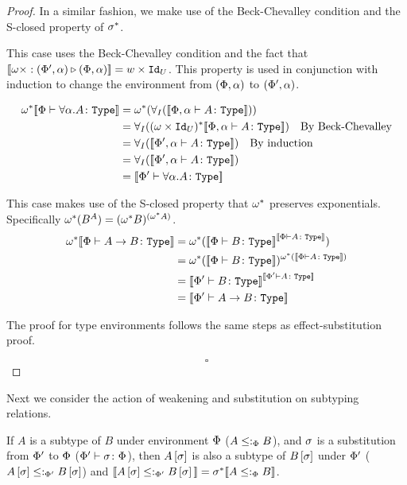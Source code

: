 \documentclass{Report}
\begin{document}
\begin{proof}
   In a similar fashion, we make use of the Beck-Chevalley condition and the S-closed property of $\si\star$.

        This case uses the Beck-Chevalley condition and the fact that $\deno{\wrel{\w\x}{(\P', \a)}{(\P,\a)}} = w\times \Id{U}$. This property is used in conjunction with induction to change the environment from $(\P, \a)$ to $(\P', \a)$.

        \begin{align}
            \w\star\deno{\typerelation{\P}{\all{\a}A}{\type}} & = \w\star(\allI(\deno{\typerelation{\P,\a}{A}{\type}}))\\
            & = \allI((\w\times\Id{U})\star\deno{\typerelation{\P,\a}{A}{\type}})\qt{By Beck-Chevalley}\\
            & = \allI(\deno{\typerelation{\P',\a}{A}{\type}})\qt{By induction}\\
            & = \allI(\deno{\typerelation{\P',\a}{A}{\type}})\\
            & = \deno{\typerelation{\P'}{\all{\a}{A}}{\type}}\\
        \end{align}
    
    This case makes use of the S-closed property that $\w\star$ preserves exponentials. Specifically $\w\star(B^A) = (\w\star B)^{(\w\star A)}$.
    \begin{align}
        \w\star\deno{\typerelation{\P}{\ab}{\type}} &= \w\star(\deno{\typerelation{\P}{B}{\type}}^{\deno{\typerelation{\P}{A}{\type}}})\\
        &=\w\star(\deno{\typerelation{\P}{B}{\type}})^{\w\star(\deno{\typerelation{\P}{A}{\type}})}\\
        & = \deno{\typerelation{\P'}{B}{\type}}^{\deno{\typerelation{\P'}{A}{\type}}}\\
        & = \deno{\typerelation{\P'}{\ab}{\type}}\\
    \end{align}

    
    The proof for type environments follows the same steps as effect-substitution proof.

    $$\square$$
\end{proof}


Next we consider the action of weakening and substitution on subtyping relations. 

\begin{theorem}
    If $A$ is a subtype of $B$ under environment $\P$ ($A \subtypep B$), and $\si$ is a substitution from $\P'$ to $\P$ ($\typerelation{\P'}{\si}{\P}$), then $A\ssi$ is also a subtype of $B\ssi$ under $\P'$ ($A\ssi\subtypepp B\ssi$) and $\deno{A\ssi\subtypepp B\ssi} = \si\star\deno{A\subtypep B}$.
\end{theorem}
\end{document}
